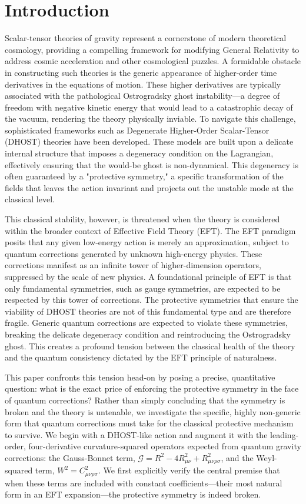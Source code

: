 \documentclass[twocolumn]{aastex631}
\begin{document}
\section{Introduction}
\label{sec:intro}
Scalar-tensor theories of gravity represent a cornerstone of modern theoretical cosmology, providing a compelling framework for modifying General Relativity to address cosmic acceleration and other cosmological puzzles. A formidable obstacle in constructing such theories is the generic appearance of higher-order time derivatives in the equations of motion. These higher derivatives are typically associated with the pathological Ostrogradsky ghost instability---a degree of freedom with negative kinetic energy that would lead to a catastrophic decay of the vacuum, rendering the theory physically inviable. To navigate this challenge, sophisticated frameworks such as Degenerate Higher-Order Scalar-Tensor (DHOST) theories have been developed. These models are built upon a delicate internal structure that imposes a degeneracy condition on the Lagrangian, effectively ensuring that the would-be ghost is non-dynamical. This degeneracy is often guaranteed by a "protective symmetry," a specific transformation of the fields that leaves the action invariant and projects out the unstable mode at the classical level.

This classical stability, however, is threatened when the theory is considered within the broader context of Effective Field Theory (EFT). The EFT paradigm posits that any given low-energy action is merely an approximation, subject to quantum corrections generated by unknown high-energy physics. These corrections manifest as an infinite tower of higher-dimension operators, suppressed by the scale of new physics. A foundational principle of EFT is that only fundamental symmetries, such as gauge symmetries, are expected to be respected by this tower of corrections. The protective symmetries that ensure the viability of DHOST theories are not of this fundamental type and are therefore fragile. Generic quantum corrections are expected to violate these symmetries, breaking the delicate degeneracy condition and reintroducing the Ostrogradsky ghost. This creates a profound tension between the classical health of the theory and the quantum consistency dictated by the EFT principle of naturalness.

This paper confronts this tension head-on by posing a precise, quantitative question: what is the exact price of enforcing the protective symmetry in the face of quantum corrections? Rather than simply concluding that the symmetry is broken and the theory is untenable, we investigate the specific, highly non-generic form that quantum corrections must take for the classical protective mechanism to survive. We begin with a DHOST-like action and augment it with the leading-order, four-derivative curvature-squared operators expected from quantum gravity corrections: the Gauss-Bonnet term, $\mathcal{G} = R^2 - 4R_{\mu\nu}^2 + R_{\mu\nu\rho\sigma}^2$, and the Weyl-squared term, $W^2 = C_{\mu\nu\rho\sigma}^2$. We first explicitly verify the central premise that when these terms are included with constant coefficients---their most natural form in an EFT expansion---the protective symmetry is indeed broken.
\end{document}
